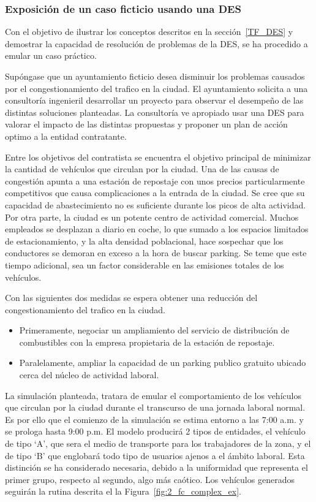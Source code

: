 \subsubsection{Exposición de un caso ficticio usando una DES}\label{example_descrp}

Con el objetivo de ilustrar los conceptos descritos en la sección~\ref{TF_DES}
y demostrar la capacidad de resolución de problemas de la DES,
se ha procedido a emular un caso práctico.

Supóngase que un ayuntamiento ficticio desea disminuir
los problemas causados por el congestionamiento del trafico en la ciudad.
El ayuntamiento solicita a una consultoría ingenieril
desarrollar un proyecto para observar el
desempeño de las distintas soluciones planteadas.
La consultoría ve apropiado usar una DES para valorar
el impacto de las distintas propuestas
y proponer un plan de acción optimo a la entidad contratante.

Entre los objetivos del contratista se encuentra el objetivo principal de
minimizar la cantidad de vehículos que circulan por la ciudad.
Una de las causas de congestión apunta a una estación de repostaje
con unos precios particularmente competitivos
que causa complicaciones a la entrada de la ciudad.
Se cree que su capacidad de abastecimiento
no es suficiente durante los picos de alta actividad.
Por otra parte, la ciudad es un potente centro de actividad comercial.
Muchos empleados se desplazan a diario en coche,
lo que sumado a los espacios limitados de estacionamiento,
y la alta densidad poblacional,
hace sospechar que los conductores se demoran en exceso a la hora de buscar parking.
Se teme que este tiempo adicional,
sea un factor considerable en las emisiones totales de los vehículos.

Con las siguientes dos medidas se espera obtener
una reducción del congestionamiento del trafico en la ciudad.

\begin{itemize}
	\item Primeramente, negociar un ampliamiento
		del servicio de distribución de combustibles
		con la empresa propietaria de la estación de repostaje.
	\item Paralelamente, ampliar la capacidad de un parking publico gratuito
		ubicado cerca del núcleo de actividad laboral.
\end{itemize}

La simulación planteada, tratara de emular el comportamiento de los vehículos
que circulan por la ciudad durante el transcurso de una jornada laboral normal.
Es por ello que el comienzo de la simulación se estima entorno a las 7:00 a.m.
y se prologa hasta 9:00 p.m.
El modelo producirá 2 tipos de entidades,
el vehículo de tipo `A', que sera el medio de transporte para los trabajadores de la zona,
y el de tipo `B' que englobará todo tipo de usuarios ajenos a el ámbito laboral.
Esta distinción se ha considerado necesaria,
debido a la uniformidad que representa el primer grupo, respecto al segundo, algo más caótico.
Los vehículos generados seguirán la rutina descrita el la Figura~\ref{fig:2_fc_complex_ex}.

